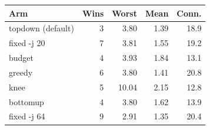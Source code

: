 \begin{tabular}{@{}lrrrr@{}}
\toprule
Arm & Wins & Worst & Mean & Conn. \\
\midrule
topdown (default) & 3 & 3.80 & 1.39 & 18.9 \\
fixed -j 20 & 7 & 3.81 & 1.55 & 19.2 \\
budget & 4 & 3.93 & 1.84 & 13.1 \\
greedy & 6 & 3.80 & 1.41 & 20.8 \\
knee & 5 & 10.04 & 2.15 & 12.8 \\
bottomup & 4 & 3.80 & 1.62 & 13.9 \\
fixed -j 64 & 9 & 2.91 & 1.35 & 20.4 \\
\bottomrule
\end{tabular}

